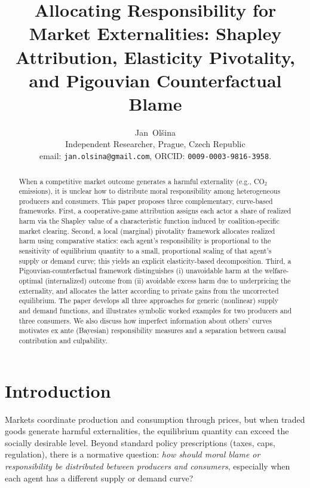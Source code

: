 \documentclass[journal, a4paper]{IEEEtran}
\begin{document}
\title{Allocating Responsibility for Market Externalities: Shapley Attribution, Elasticity Pivotality, and Pigouvian Counterfactual Blame}

\author{Jan~Ol\v{s}ina\\[1ex] Independent Researcher, Prague, Czech Republic\\
email: \texttt{jan.olsina@gmail.com},  ORCID: \texttt{0009-0003-9816-3958}.}


\maketitle

\begin{abstract}
When a competitive market outcome generates a harmful externality (e.g., CO$_2$ emissions), it is unclear how to distribute moral responsibility among heterogeneous producers and consumers. This paper proposes three complementary, curve-based frameworks. First, a cooperative-game attribution assigns each actor a share of realized harm via the Shapley value of a characteristic function induced by coalition-specific market clearing. Second, a local (marginal) pivotality framework allocates realized harm using comparative statics: each agent's responsibility is proportional to the sensitivity of equilibrium quantity to a small, proportional scaling of that agent's supply or demand curve; this yields an explicit elasticity-based decomposition. Third, a Pigouvian-counterfactual framework distinguishes (i) unavoidable harm at the welfare-optimal (internalized) outcome from (ii) avoidable excess harm due to underpricing the externality, and allocates the latter according to private gains from the uncorrected equilibrium. The paper develops all three approaches for generic (nonlinear) supply and demand functions, and illustrates symbolic worked examples for two producers and three consumers. We also discuss how imperfect information about others' curves motivates ex ante (Bayesian) responsibility measures and a separation between causal contribution and culpability.
\end{abstract}

\section{Introduction}
Markets coordinate production and consumption through prices, but when traded goods generate harmful externalities, the equilibrium quantity can exceed the socially desirable level. Beyond standard policy prescriptions (taxes, caps, regulation), there is a normative question: \emph{how should moral blame or responsibility be distributed between producers and consumers}, especially when each agent has a different supply or demand curve?
\end{document}

